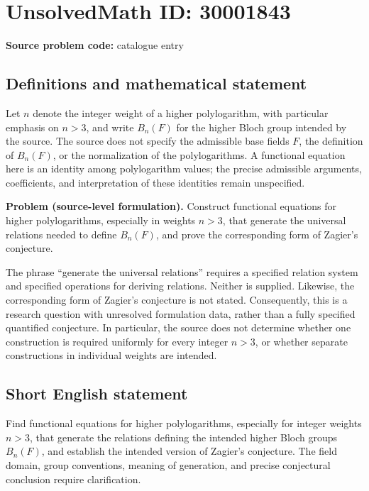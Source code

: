 \documentclass[11pt]{article}
\begin{document}
\section*{UnsolvedMath ID: 30001843}
\textbf{Source problem code:} catalogue entry
\subsection{Definitions and mathematical statement}
Let \(n\) denote the integer weight of a higher polylogarithm, with particular emphasis on \(n>3\), and write \(B_n(F)\) for the higher Bloch group intended by the source. The source does not specify the admissible base fields \(F\), the definition of \(B_n(F)\), or the normalization of the polylogarithms. A functional equation here is an identity among polylogarithm values; the precise admissible arguments, coefficients, and interpretation of these identities remain unspecified.

\textbf{Problem (source-level formulation).} Construct functional equations for higher polylogarithms, especially in weights \(n>3\), that generate the universal relations needed to define \(B_n(F)\), and prove the corresponding form of Zagier's conjecture.

The phrase ``generate the universal relations'' requires a specified relation system and specified operations for deriving relations. Neither is supplied. Likewise, the corresponding form of Zagier's conjecture is not stated. Consequently, this is a research question with unresolved formulation data, rather than a fully specified quantified conjecture. In particular, the source does not determine whether one construction is required uniformly for every integer \(n>3\), or whether separate constructions in individual weights are intended.
\subsection{Short English statement}
Find functional equations for higher polylogarithms, especially for integer weights \(n>3\), that generate the relations defining the intended higher Bloch groups \(B_n(F)\), and establish the intended version of Zagier's conjecture. The field domain, group conventions, meaning of generation, and precise conjectural conclusion require clarification.
\end{document}
